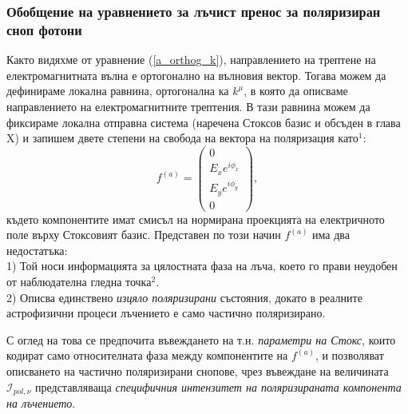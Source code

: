 \subsubsection{Обобщение на уравнението за лъчист пренос за поляризиран сноп фотони}

Както видяхме от уравнение (\ref{a_orthog_k}), направлението на трептене на електромагнитната вълна е ортогонално на вълновия вектор. Тогава можем да дефинираме локална равнина, ортогонална ка $k^\mu$, в която да описваме направлението на електромагнитните трептения. В тази равнина можем да фиксираме локална отправна система (наречена Стоксов базис и обсъден в глава {\color{red} X}) и запишем двете степени на свобода на вектора на поляризация като$^1$:
\begin{equation}
f^{(a)} = \begin{pmatrix}
			0 \\
			E_{x} e^{i\phi_{x}} \\
			E_{y} e^{i\phi_{y}} \\
			0
	\end{pmatrix},
\end{equation}
където компонентите имат смисъл на нормирана проекцията на електричното поле върху Стоксовият базис. Представен по този начин $f^{(a)}$ има два недостатъка:\\

1) Той носи информацията за цялостната фаза на лъча, което го прави неудобен от наблюдателна гледна точка$^2$.\\

2) Описва единствено \emph{изцяло поляризирани} състояния, докато в реалните астрофизични процеси лъчението е само частично поляризирано.\\


С оглед на това се предпочита въвеждането на т.н. \emph{параметри на Стокс}, които кодират само относителната фаза между компонентите на $f^{(a)}$, и позволяват описването на частично поляризирани снопове, чрез въвеждане на величината $\mathcal{I}_{pol, \nu}$ представляваща \emph{специфичния интензитет на поляризираната компонента на лъчението}.

